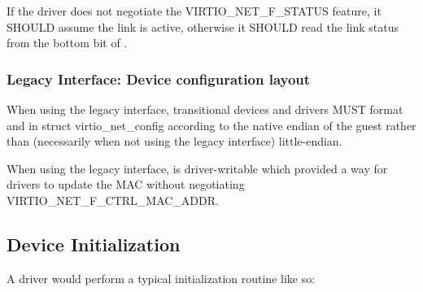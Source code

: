 If the driver does not negotiate the VIRTIO_NET_F_STATUS feature, it SHOULD
assume the link is active, otherwise it SHOULD read the link status from
the bottom bit of .

\subsubsection{Legacy Interface: Device configuration layout}\label{sec:Device Types / Network Device / Device configuration layout / Legacy Interface: Device configuration layout}
When using the legacy interface, transitional devices and drivers
MUST format  and
 in struct virtio_net_config
according to the native endian of the guest rather than
(necessarily when not using the legacy interface) little-endian.

When using the legacy interface,  is driver-writable
which provided a way for drivers to update the MAC without
negotiating VIRTIO_NET_F_CTRL_MAC_ADDR.

\subsection{Device Initialization}\label{sec:Device Types / Network Device / Device Initialization}

A driver would perform a typical initialization routine like so:


